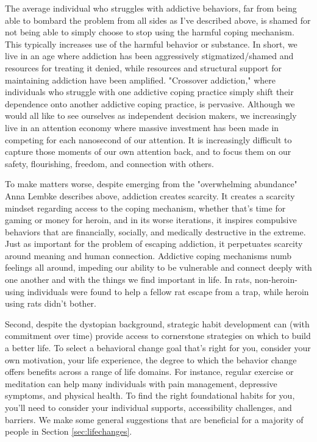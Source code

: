 \documentclass[12pt,letterpaper]{book}
\begin{document}
The average individual who struggles with addictive behaviors, far from being able to bombard the problem from all sides as I've described above, is shamed for not being able to simply choose to stop using the harmful coping mechanism. This typically increases use of the harmful behavior or substance. In short, we live in an age where addiction has been aggressively stigmatized/shamed and resources for treating it denied, while resources and structural support for maintaining addiction have been amplified. "Crossover addiction," where individuals who struggle with one addictive coping practice simply shift their dependence onto another addictive coping practice, is pervasive. Although we would all like to see ourselves as independent decision makers, we increasingly live in an attention economy where massive investment has been made in competing for each nanosecond of our attention. It is increasingly difficult to capture those moments of our own attention back, and to focus them on our safety, flourishing, freedom, and connection with others.

To make matters worse, despite emerging from the "overwhelming abundance" Anna Lembke describes above, addiction creates scarcity. It creates a scarcity mindset regarding access to the coping mechanism, whether that's time for gaming or money for heroin, and in its worse iterations, it inspires compulsive behaviors that are financially, socially, and medically destructive in the extreme. Just as important for the problem of escaping addiction, it perpetuates scarcity around meaning and human connection. Addictive coping mechanisms numb feelings all around, impeding our ability to be vulnerable and connect deeply with one another and with the things we find important in life. In rats, non-heroin-using individuals were found to help a fellow rat escape from a trap, while heroin using rats didn't bother.

Second, despite the dystopian background, strategic habit development can (with commitment over time) provide access to cornerstone strategies on which to build a better life. To select a behavioral change goal that's right for you, consider your own motivation, your life experience, the degree to which the behavior change offers benefits across a range of life domains. For instance, regular exercise or meditation can help many individuals with pain management, depressive symptoms, and physical health. To find the right foundational habits for you, you'll need to consider your individual supports, accessibility challenges, and barriers. We make some general suggestions that are beneficial for a majority of people in Section \ref{sec:lifechanges}.
\end{document}
